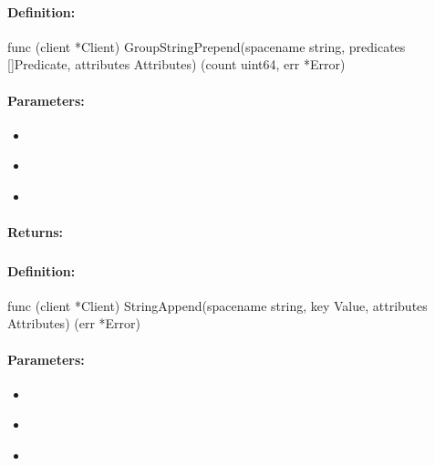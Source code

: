 \paragraph{Definition:}
\begin{gocode}
func (client *Client) GroupStringPrepend(spacename string, predicates []Predicate, attributes Attributes) (count uint64, err *Error)
\end{gocode}

\paragraph{Parameters:}
\begin{itemize}[noitemsep]
\item {}\\

\item {}\\

\item {}\\

\end{itemize}

\paragraph{Returns:}


\pagebreak
\subsubsection{}
\label{api:Go:StringAppend}


\paragraph{Definition:}
\begin{gocode}
func (client *Client) StringAppend(spacename string, key Value, attributes Attributes) (err *Error)
\end{gocode}

\paragraph{Parameters:}
\begin{itemize}[noitemsep]
\item {}\\

\item {}\\

\item {}\\

\end{itemize}


